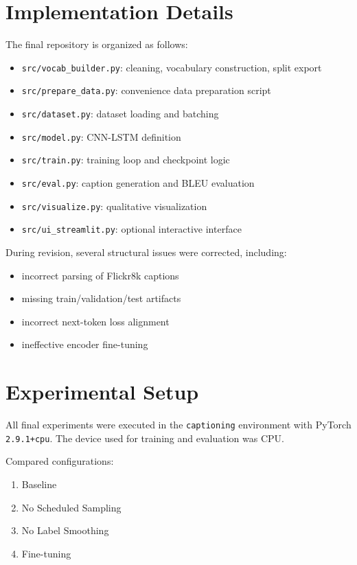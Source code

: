 \documentclass[11pt,a4paper]{article}
\begin{document}
\section{Implementation Details}

The final repository is organized as follows:
\begin{itemize}[leftmargin=*]
    \item \texttt{src/vocab\_builder.py}: cleaning, vocabulary construction, split export
    \item \texttt{src/prepare\_data.py}: convenience data preparation script
    \item \texttt{src/dataset.py}: dataset loading and batching
    \item \texttt{src/model.py}: CNN-LSTM definition
    \item \texttt{src/train.py}: training loop and checkpoint logic
    \item \texttt{src/eval.py}: caption generation and BLEU evaluation
    \item \texttt{src/visualize.py}: qualitative visualization
    \item \texttt{src/ui\_streamlit.py}: optional interactive interface
\end{itemize}

During revision, several structural issues were corrected, including:
\begin{itemize}[leftmargin=*]
    \item incorrect parsing of Flickr8k captions
    \item missing train/validation/test artifacts
    \item incorrect next-token loss alignment
    \item ineffective encoder fine-tuning
\end{itemize}

\section{Experimental Setup}

All final experiments were executed in the \texttt{captioning} environment with PyTorch \texttt{2.9.1+cpu}. The device used for training and evaluation was CPU.

Compared configurations:
\begin{enumerate}[leftmargin=*]
    \item Baseline
    \item No Scheduled Sampling
    \item No Label Smoothing
    \item Fine-tuning
\end{enumerate}
\end{document}
